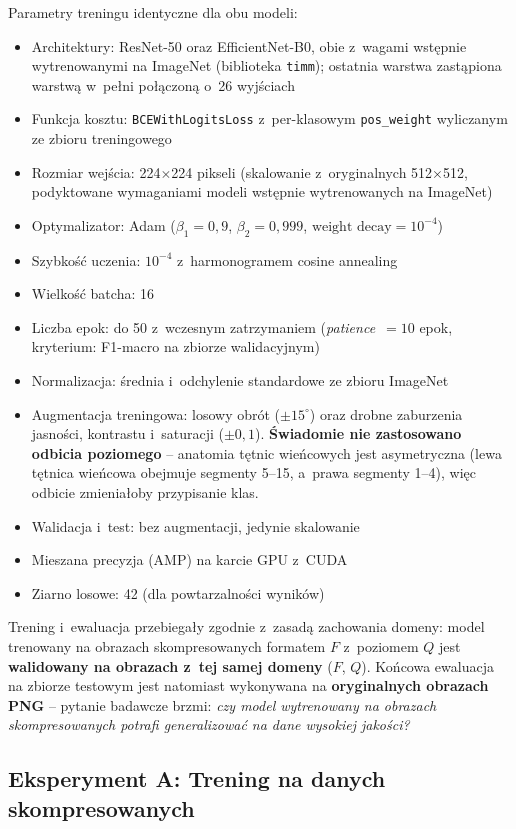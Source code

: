 \documentclass[12pt,a4paper]{article}
\begin{document}
Parametry treningu identyczne dla obu modeli:
\begin{itemize}
    \item Architektury: ResNet-50 oraz EfficientNet-B0, obie z~wagami wstępnie wytrenowanymi na ImageNet (biblioteka \texttt{timm}); ostatnia warstwa zastąpiona warstwą w~pełni połączoną o~26 wyjściach
    \item Funkcja kosztu: \texttt{BCEWithLogitsLoss} z~per-klasowym \texttt{pos\_weight} wyliczanym ze zbioru treningowego
    \item Rozmiar wejścia: 224$\times$224 pikseli (skalowanie z~oryginalnych 512$\times$512, podyktowane wymaganiami modeli wstępnie wytrenowanych na ImageNet)
    \item Optymalizator: Adam ($\beta_1 = 0{,}9$, $\beta_2 = 0{,}999$, $\text{weight decay} = 10^{-4}$)
    \item Szybkość uczenia: $10^{-4}$ z~harmonogramem cosine annealing
    \item Wielkość batcha: 16
    \item Liczba epok: do 50 z~wczesnym zatrzymaniem (\textit{patience}~$= 10$ epok, kryterium: F1-macro na zbiorze walidacyjnym)
    \item Normalizacja: średnia i~odchylenie standardowe ze zbioru ImageNet
    \item Augmentacja treningowa: losowy obrót ($\pm 15^{\circ}$) oraz drobne zaburzenia jasności, kontrastu i~saturacji ($\pm 0{,}1$). \textbf{Świadomie nie zastosowano odbicia poziomego} -- anatomia tętnic wieńcowych jest asymetryczna (lewa tętnica wieńcowa obejmuje segmenty 5--15, a~prawa segmenty 1--4), więc odbicie zmieniałoby przypisanie klas.
    \item Walidacja i~test: bez augmentacji, jedynie skalowanie
    \item Mieszana precyzja (AMP) na karcie GPU z~CUDA
    \item Ziarno losowe: 42 (dla powtarzalności wyników)
\end{itemize}

Trening i~ewaluacja przebiegały zgodnie z~zasadą zachowania domeny: model trenowany na obrazach skompresowanych formatem $F$ z~poziomem $Q$ jest \textbf{walidowany na obrazach z~tej samej domeny} ($F$, $Q$). Końcowa ewaluacja na zbiorze testowym jest natomiast wykonywana na \textbf{oryginalnych obrazach PNG} -- pytanie badawcze brzmi: \textit{czy model wytrenowany na obrazach skompresowanych potrafi generalizować na dane wysokiej jakości?}

\subsection{Eksperyment A: Trening na danych skompresowanych}
\end{document}
